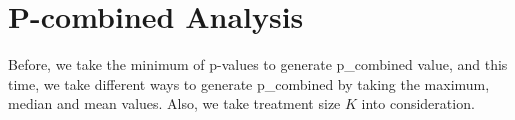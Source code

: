 \documentclass[10pt,english]{article}\usepackage{graphicx, color}
\numberwithin{equation}{section}
\numberwithin{figure}{section}
\begin{document}
\section{P-combined Analysis}
Before, we take the minimum of p-values to generate p\_combined value, and this time, we take different ways to generate p\_combined by taking the maximum, median and mean values. Also, we take treatment size $K$ into consideration.
\begin{figure}[htbp]
\centering{}
\end{figure}
\end{document}
